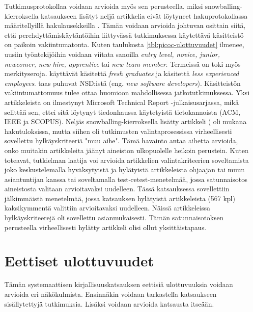 \documentclass[utf8]{gradu3}
\begin{document}
Tutkimusprotokollaa voidaan arvioida myös sen perusteella, miksi snowballing-kierroksella katsaukseen lisätyt neljä artikkelia eivät löytyneet hakuprotokollassa määritellyillä hakulausekkeilla %
\parencites%
    {bjornson-dingsøyr-2005}%
    {kulkarni-ym-2010}%
    {hemphill-begel-2011}%
    {viviani-murphy-2019}%
\relax.
%
Tämän voidaan arvioida johtuvan osittain siitä, että perehdyttämiskäytäntöihin liittyvässä tutkimuksessa käytettävä käsitteistö on paikoin vakiintumatonta. Kuten taulukosta \ref{tbl:picoc-ulottuvuudet} ilmenee, uusiin työntekijöihin voidaan viitata sanoilla \textit{entry level, novice, junior, newcomer, new hire, apprentice} tai \textit{new team member}. Termeissä on toki myös merkityseroja. \textcite{kulkarni-ym-2010} käyttävät käsitettä \textit{fresh graduates} ja \textcite{bjornson-dingsøyr-2005} käsitettä \textit{less experienced employees}. \textcite{begel-simon-2008} taas puhuvat NSD:istä (eng. \textit{new software developers}). Käsitteistön vakiintumattomuus tulee ottaa huomioon mahdollisessa jatkotutkimuksessa. Yksi artikkeleista \parencite{hemphill-begel-2011} on ilmestynyt Microsoft Technical Report -julkaisusarjassa, mikä selittää sen, ettei sitä löytynyt tiedonhaussa käytetyistä tietokannoista (ACM, IEEE ja SCOPUS). Neljäs snowballing-kierroksella lisätty artikkeli (\textcite{viviani-murphy-2019} oli mukana hakutuloksissa, mutta siihen oli tutkimusten valintaprosessissa virheellisesti sovellettu hylkäyskriteeriä "muu aihe". Tämä havainto antaa aihetta arvioida, onko muitakin artikkeleita jäänyt aineiston ulkopuolelle heikoin perustein. Kuten \textcite{kitchenham-charters-2007} toteavat, tutkielman laatija voi arvioida artikkelien valintakriteerien soveltamista joko keskustelemalla hyväksytyistä ja hylätyistä artikkeleista ohjaajan tai muun asiantuntijan kanssa tai soveltamalla test-retest-menetelmää, jossa satunnaisotos aineistosta valitaan arvioitavaksi uudelleen. Tässä katsauksessa sovellettiin jälkimmäistä menetelmää, jossa katsauksen hylätyistä artikkeleista (567 kpl) kaksikymmentä valittiin arvioitavaksi uudelleen. Näissä artikkeleissa hylkäyskriteerejä oli sovellettu asianmukaisesti. Tämän satunnaisotoksen perusteella virheellisesti hylätty artikkeli \parencite{viviani-murphy-2019} olisi ollut yksittäistapaus. 


\section{Eettiset ulottuvuudet}

Tämän systemaattisen kirjallisuuskatsauksen eettisiä ulottuvuuksia voidaan arvioida eri näkökulmista. Ensinnäkin voidaan tarkastella katsaukseen sisällytettyjä tutkimuksia. Lisäksi voidaan arvioida katsausta itseään.
\end{document}
